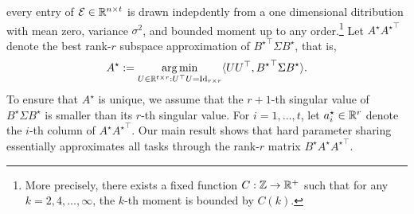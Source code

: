 every entry of $\mathcal{E} \in \mathbb{R}^{n \times t}$ is drawn indepdently from a one dimensional ditribution with mean zero, variance $\sigma^2$, and bounded moment up to any order.\footnote{More precisely, there exists a fixed function $C: \mathbb{Z} \rightarrow \mathbb{R}^+$ such that for any $k = 2, 4, \dots, \infty$, the $k$-th moment is bounded by $C(k)$.}
Let $A^{\star} {A^{\star}}^{\top}$ denote the best rank-$r$ subspace approximation of ${B^{\star}}^\top\Sigma B^{\star}$, that is,
\[ A^{\star} := \operatorname*{arg\,min}_{U\in\mathbb{R}^{t\times r} : U^{\top} U = \operatorname{Id}_{r\times r}} \langle U U^{\top}, {B^{\star}}^{\top} \Sigma B^{\star} \rangle. \]
To ensure that $A^{\star}$ is unique, we assume that the $r+1$-th singular value of $B^{\star}\Sigma B^{\star}$ is smaller than its $r$-th singular value.
For $i = 1,\dots, t$, let $a_i^{\star} \in\mathbb{R}^r$ denote the $i$-th column of $A^{\star}{A^{\star}}^{\top}$.
Our main result shows that hard parameter sharing essentially approximates all tasks through the rank-$r$ matrix $B^{\star} A^{\star} {A^{\star}}^{\top}$.


